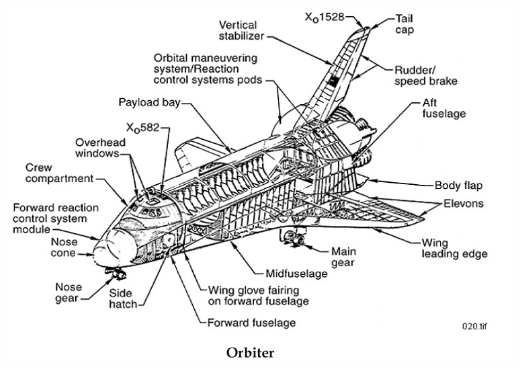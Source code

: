 \documentclass[13pt]{article}
\begin{document}
\includegraphics[width=1\textwidth]{Orbiter.jpg}
\end{document}
